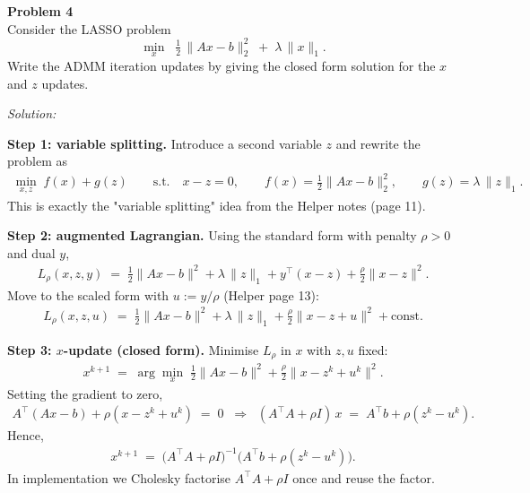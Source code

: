 \documentclass[a4paper, 11pt]{article}
\newenvironment{problem}[2][Problem]
    { \begin{mdframed}[backgroundcolor=gray!20] \textbf{#1 #2} \\}
    {  \end{mdframed}}
\newenvironment{solution}
    {\textit{Solution:}}
    {}
\begin{document}
\begin{problem}{4}
Consider the LASSO problem
\[
    \min_{x} \;\; \tfrac{1}{2}\, \|A x - b\|_2^2 \;+\; \lambda\, \|x\|_1.
\]
Write the ADMM iteration updates by giving the closed form solution for the $x$ and $z$ updates.
\end{problem}
\begin{solution}

\textbf{Step 1: variable splitting.} Introduce a second variable $z$ and rewrite the problem as
\begin{align*}
    \min_{x, z} \; f(x) + g(z) \qquad \text{s.t.} \quad x - z = 0, \qquad f(x) = \tfrac{1}{2}\|A x - b\|_2^2, \qquad g(z) = \lambda\, \|z\|_1.
\end{align*}
This is exactly the "variable splitting" idea from the Helper notes (page 11).

\textbf{Step 2: augmented Lagrangian.} Using the standard form with penalty $\rho > 0$ and dual $y$,
\begin{align*}
    L_{\rho}(x, z, y) \;=\; \tfrac{1}{2}\|A x - b\|^2 + \lambda\, \|z\|_1 + y^{\top}(x - z) + \tfrac{\rho}{2} \|x - z\|^2.
\end{align*}
Move to the scaled form with $u := y / \rho$ (Helper page 13):
\begin{align*}
    L_{\rho}(x, z, u) \;=\; \tfrac{1}{2}\|A x - b\|^2 + \lambda\, \|z\|_1 + \tfrac{\rho}{2} \|x - z + u\|^2 + \mathrm{const}.
\end{align*}

\textbf{Step 3: $x$-update (closed form).} Minimise $L_{\rho}$ in $x$ with $z, u$ fixed:
\begin{align*}
    x^{k+1} \;=\; \arg\min_x \; \tfrac{1}{2}\|A x - b\|^2 + \tfrac{\rho}{2}\|x - z^k + u^k\|^2.
\end{align*}
Setting the gradient to zero,
\begin{align*}
    A^{\top}(A x - b) + \rho (x - z^k + u^k) \;=\; 0 \;\;\Longrightarrow\;\; (A^{\top} A + \rho I)\, x \;=\; A^{\top} b + \rho (z^k - u^k).
\end{align*}
Hence,
\begin{align*}
    \boxed{\; x^{k+1} \;=\; \big(A^{\top} A + \rho I\big)^{-1} \big(A^{\top} b + \rho (z^k - u^k)\big). \;}
\end{align*}
In implementation we Cholesky factorise $A^{\top} A + \rho I$ once and reuse the factor.


\end{solution}
\end{document}
